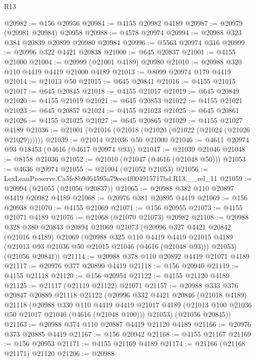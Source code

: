 \begin{lexlean}{R13}
\begin{coremodule}
@20982 := @156 @20956
@20984 := @4155 @20982 @4189
@20987 := @20979 (@20981 @20984) @20958
@20988 := @4578 @20974
@20994 := @20988 @323 @384 @20839 @20899 @20980 @20984
@20996 := @5563 @20974 @316
@20999 := @20996 @322 @4421 @20838
@21000 := @645 @20837
@21001 := @4155 @21000
@21004 := @20999 (@21001 @4189) @20980
@21010 := @20988 @320 @110 @4419 @4419 @21000 @4189
@21013 := @8099 @20974 @179 @4419
@21014 := @21013 @50
@21015 := @645 @20841
@21016 := @4155 @21015
@21017 := @645 @20845
@21018 := @4155 @21017
@21019 := @645 @20849
@21020 := @4155 @21019
@21021 := @645 @20853
@21022 := @4155 @21021
@21023 := @645 @20857
@21024 := @4155 @21023
@21025 := @645 @20861
@21026 := @4155 @21025
@21027 := @645 @20865
@21029 := @4155 @21027 @4189
@21036 := @21001 (@21016 (@21018 (@21020 (@21022 (@21024 (@21026 @21029))))))
@21039 := @21014 @21036 @50 @21000
@21046 := @4611 @20974 @93 @18453 (@4616 (@4617 @20974 @93))
@21047 := @21039 @21046
@21048 := @8158 @21036
@21052 := @21010 (@21047 (@4616 (@21048 @50)))
@21053 := @4636 @20974
@21055 := @21004 (@21052 @21053)
@21056 := LexLeanPreserve.Ca5fe8b9d64595a79eee4f004915717bd.R13.__rel_11
@21059 := @20994 (@21055 (@21056 @20837))
@21065 := @20988 @382 @110 @20897 @4419 @20982 @4189
@21068 := @20976 @381 @20895 @4419
@21069 := @156 @20938
@21070 := @4155 @21069
@21071 := @156 @20955
@21073 := @4155 @21071 @4189
@21076 := @21068 (@21070 @21073) @20982
@21108 := @20988
    @328
    @380
    @20843
    @20894
    @21069
    @21073
    (@20996
      @327
      @4421
      @20842
      (@21016 @4189)
      @21069
      (@20988
        @325
        @110
        @4419
        @4419
        @21015
        @4189
        (@21013 @93 @21036 @50 @21015 @21046 (@4616 (@21048 @93)))
        @21053)
      (@21056 @20841))
@21114 := @20988 @378 @110 @20892 @4419 @21071 @4189
@21117 := @20976 @377 @20890 @4419
@21118 := @156 @20940
@21119 := @4155 @21118
@21120 := @156 @20954
@21122 := @4155 @21120 @4189
@21125 := @21117 (@21119 @21122) @21071
@21157 := @20988
    @333
    @376
    @20847
    @20889
    @21118
    @21122
    (@20996
      @332
      @4421
      @20846
      (@21018 @4189)
      @21118
      (@20988
        @330
        @110
        @4419
        @4419
        @21017
        @4189
        (@21013 @100 @21036 @50 @21017 @21046 (@4616 (@21048 @100)))
        @21053)
      (@21056 @20845))
@21163 := @20988 @374 @110 @20887 @4419 @21120 @4189
@21166 := @20976 @373 @20885 @4419
@21167 := @156 @20942
@21168 := @4155 @21167
@21169 := @156 @20953
@21171 := @4155 @21169 @4189
@21174 := @21166 (@21168 @21171) @21120
@21206 := @20988

\end{coremodule}
\end{lexlean}
